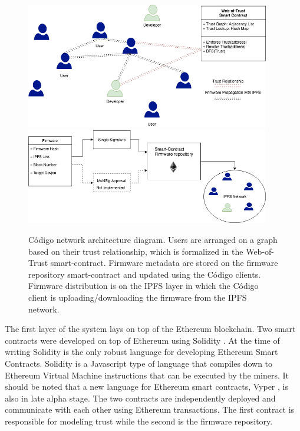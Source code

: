 {{\begin{figure}[htb!]
\centering
\includegraphics[width=0.95\textwidth]{./pics/IPFS-Archi.png}
\includegraphics[width=0.95\textwidth]{./pics/Repo-Archi.png}
\caption{Código network architecture diagram. Users are arranged on a graph based on their trust relationship, which is formalized in the Web-of-Trust smart-contract. Firmware metadata are stored on the firmware repository smart-contract and updated using the Código clients. Firmware distribution is on the IPFS layer in which the Código client is uploading/downloading the firmware from the IPFS network.}
\label{fig:arch}
\end{figure}


The first layer of the system lays on top of the Ethereum blockchain. Two smart contracts were developed on top of Ethereum using Solidity \cite{solidity}. At the time of writing Solidity is the only robust language for developing Ethereum Smart Contracts. Solidity is a Javascript type of language that compiles down to Ethereum Virtual Machine instructions that can be executed by the miners. It should be noted that a new language for Ethereum smart contracts, Vyper \cite{vyper}, is also in late alpha stage. The two contracts are independently deployed and communicate with each other using Ethereum transactions. The first contract is responsible for modeling trust while the second is the firmware repository. 

}}
